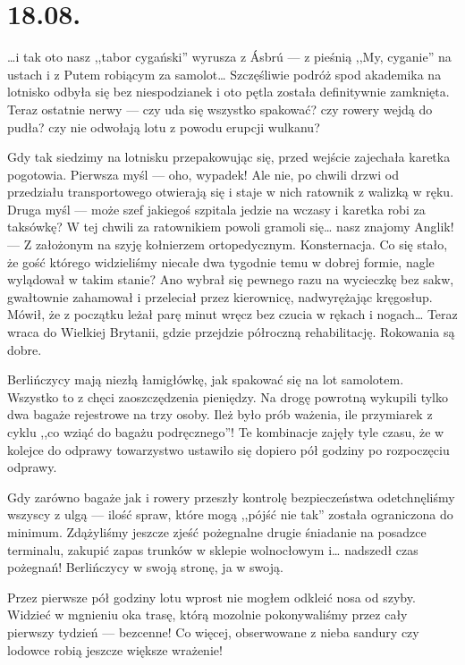 \chapter*{18.08.}

…i tak oto nasz ,,tabor cygański'' wyrusza z Ásbrú --- z pieśnią ,,My, cyganie'' na ustach i z Putem robiącym za samolot… Szczęśliwie podróż spod akademika na lotnisko odbyła się bez niespodzianek i oto pętla została definitywnie zamknięta. Teraz ostatnie nerwy --- czy uda się wszystko spakować? czy rowery wejdą do pudła? czy nie odwołają lotu z powodu erupcji wulkanu?

Gdy tak siedzimy na lotnisku przepakowując się, przed wejście zajechała karetka pogotowia. Pierwsza myśl --- oho, wypadek! Ale nie, po chwili drzwi od przedziału transportowego otwierają się i staje w nich ratownik z walizką w ręku. Druga myśl --- może szef jakiegoś szpitala jedzie na wczasy i karetka robi za taksówkę? W tej chwili za ratownikiem powoli gramoli się… nasz znajomy Anglik! --- Z założonym na szyję kołnierzem ortopedycznym. Konsternacja. Co się stało, że gość którego widzieliśmy niecałe dwa tygodnie temu w dobrej formie, nagle wylądował w takim stanie? Ano wybrał się pewnego razu na wycieczkę bez sakw, gwałtownie zahamował i przeleciał przez kierownicę, nadwyrężając kręgosłup. Mówił, że z początku leżał parę minut wręcz bez czucia w rękach i nogach… Teraz wraca do Wielkiej Brytanii, gdzie przejdzie półroczną rehabilitację. Rokowania są dobre.

Berlińczycy mają niezłą łamigłówkę, jak spakować się na lot samolotem. Wszystko to z chęci zaoszczędzenia pieniędzy. Na drogę powrotną wykupili tylko dwa bagaże rejestrowe na trzy osoby. Ileż było prób ważenia, ile przymiarek z cyklu ,,co wziąć do bagażu podręcznego''! Te kombinacje zajęły tyle czasu, że w  kolejce do odprawy towarzystwo ustawiło się dopiero pół godziny po rozpoczęciu odprawy.


Gdy zarówno bagaże jak i rowery przeszły kontrolę bezpieczeństwa odetchnęliśmy wszyscy z ulgą --- ilość spraw, które mogą ,,pójść nie tak'' została ograniczona do minimum. Zdążyliśmy jeszcze zjeść pożegnalne drugie śniadanie na posadzce terminalu, zakupić zapas trunków w sklepie wolnocłowym i… nadszedł czas pożegnań! Berlińczycy w swoją stronę, ja w swoją.

Przez pierwsze pół godziny lotu wprost nie mogłem odkleić nosa od szyby. Widzieć w mgnieniu oka trasę, którą mozolnie pokonywaliśmy przez cały pierwszy tydzień --- bezcenne! Co więcej, obserwowane z nieba sandury czy lodowce robią jeszcze większe wrażenie!

